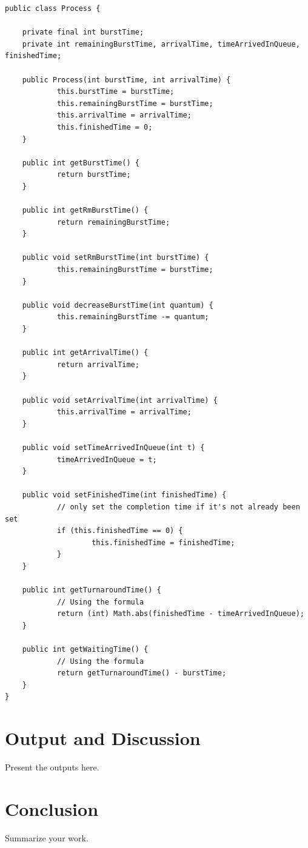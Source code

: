 \documentclass[12pt]{article}
\begin{document}
\begin{lstlisting}
public class Process {

	private final int burstTime;
	private int remainingBurstTime, arrivalTime, timeArrivedInQueue, finishedTime;

	public Process(int burstTime, int arrivalTime) {
			this.burstTime = burstTime;
			this.remainingBurstTime = burstTime;
			this.arrivalTime = arrivalTime;
			this.finishedTime = 0;
	}

	public int getBurstTime() {
			return burstTime;
	}

	public int getRmBurstTime() {
			return remainingBurstTime;
	}

	public void setRmBurstTime(int burstTime) {
			this.remainingBurstTime = burstTime;
	}

	public void decreaseBurstTime(int quantum) {
			this.remainingBurstTime -= quantum;
	}

	public int getArrivalTime() {
			return arrivalTime;
	}

	public void setArrivalTime(int arrivalTime) {
			this.arrivalTime = arrivalTime;
	}

	public void setTimeArrivedInQueue(int t) {
			timeArrivedInQueue = t;
	}

	public void setFinishedTime(int finishedTime) {
			// only set the completion time if it's not already been set
			if (this.finishedTime == 0) {
					this.finishedTime = finishedTime;
			}
	}

	public int getTurnaroundTime() {
			// Using the formula
			return (int) Math.abs(finishedTime - timeArrivedInQueue);
	}

	public int getWaitingTime() {
			// Using the formula
			return getTurnaroundTime() - burstTime;
	}
}
\end{lstlisting}

\newpage
\section{Output and Discussion}
Present the outputs here.

\newpage
\section{Conclusion}
Summarize your work.


\newpage


\end{document}
